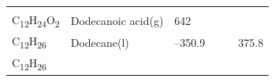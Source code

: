 \documentclass[
  9pt,
]{extbook}
\theoremstyle{definition}
\theoremstyle{definition}
\theoremstyle{definition}
\theoremstyle{remark}
\begin{document}
\begin{longtable}[]{@{}llllll@{}}
\begin{minipage}[t]{0.15\columnwidth}
\strut
\end{minipage} & \begin{minipage}[t]{0.14\columnwidth}\raggedright
\strut
\end{minipage} & \begin{minipage}[t]{0.14\columnwidth}\raggedright
\strut
\end{minipage}\tabularnewline
\begin{minipage}[t]{0.07\columnwidth}\raggedright
C\textsubscript{12}H\textsubscript{24}O\textsubscript{2}\strut
\end{minipage} & \begin{minipage}[t]{0.17\columnwidth}\raggedright
Dodecanoic acid(g)\strut
\end{minipage} & \begin{minipage}[t]{0.15\columnwidth}\raggedright
642\strut
\end{minipage} & \begin{minipage}[t]{0.15\columnwidth}\raggedright
\strut
\end{minipage} & \begin{minipage}[t]{0.14\columnwidth}\raggedright
\strut
\end{minipage} & \begin{minipage}[t]{0.14\columnwidth}\raggedright
\strut
\end{minipage}\tabularnewline
\begin{minipage}[t]{0.07\columnwidth}\raggedright
C\textsubscript{12}H\textsubscript{26}\strut
\end{minipage} & \begin{minipage}[t]{0.17\columnwidth}\raggedright
Dodecane(l)\strut
\end{minipage} & \begin{minipage}[t]{0.15\columnwidth}\raggedright
--350.9\strut
\end{minipage} & \begin{minipage}[t]{0.15\columnwidth}\raggedright
\strut
\end{minipage} & \begin{minipage}[t]{0.14\columnwidth}\raggedright
\strut
\end{minipage} & \begin{minipage}[t]{0.14\columnwidth}\raggedright
375.8\strut
\end{minipage}\tabularnewline
\begin{minipage}[t]{0.07\columnwidth}\raggedright
C\textsubscript{12}H\textsubscript{26}\strut
\end{minipage} & \begin{minipage}[t]{0.17\columnwidth}\raggedright

\end{minipage}
\end{longtable}
\end{document}
